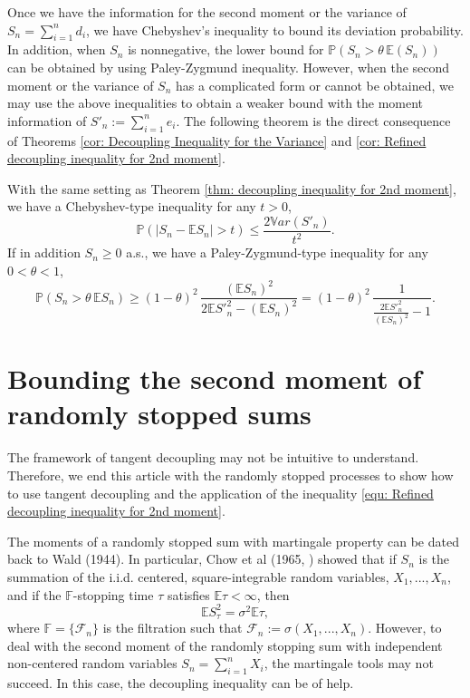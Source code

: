 \documentclass[ECP]{ejpecp} %
\newcommand{\F}{\mathcal{F}}
\newcommand{\lpar}{\left(}
\newcommand{\rpar}{\right)}
\newcommand{\pro}{\mathbb{P}}
\newcommand{\E}{\mathbb{E}}
\newcommand{\sumn}{\sum\limits_{i=1}^n}
\newcommand{\var}{\mathbb{V}ar}
\begin{document}
Once we have the information for the second moment or the variance of $ S_n = \sumn d_i$, we have Chebyshev's inequality to bound its deviation probability. In addition, when $S_n$ is nonnegative, the lower bound for $\pro(S_n>\theta \,\E(S_n))$ can be obtained by using Paley-Zygmund inequality. However, when the second moment or the variance of $S_n$ has a complicated form or cannot be obtained, we may use the above inequalities to obtain a weaker bound with the moment information of $S'_n:= \sumn e_i$. The following theorem is the direct consequence of Theorems \ref{cor: Decoupling Inequality for the Variance} and \ref{cor: Refined decoupling inequality for 2nd moment}.

\begin{theorem}
    \label{cor: Chebyshev inequ}
    With the same setting as Theorem \ref{thm: decoupling inequality for 2nd moment}, we have a Chebyshev-type inequality for any $t>0$,
    \begin{equation}
        \label{equ: Chebyshev ineq}
        \pro\lpar |S_n - \E S_n| >t \rpar \leq \frac{2\var(S'_n)}{t^2}.
    \end{equation}
    If in addition $S_n \geq 0$ a.s.,  we have a Paley-Zygmund-type inequality for any $0<\theta<1$,
    \begin{equation}
        \label{equ: Paley-Zygmund ineq}
        \pro(S_n > \theta\, \E S_n) \geq (1-\theta)^2 \, \frac{(\E S_n)^2}{ 2 \E {S'}_n^2 - (\E S_n)^2 } = (1-\theta)^2 \, \frac{1}{ \frac{2 \E {S'}_n^2}{(\E S_n)^2} - 1 }.
    \end{equation}
\end{theorem}



\section{Bounding the second moment of randomly stopped sums}
\label{sec: Applications}
The framework of tangent decoupling may not be intuitive to understand. Therefore, we end this article with the randomly stopped processes to show how to use tangent decoupling and the application of the inequality \eqref{equ: Refined decoupling inequality for 2nd moment}.


The moments of a randomly stopped sum with martingale property can be dated back to Wald \cite{wald1944cumulative} (1944). %
In particular, Chow et al (1965, \cite{chow1965moments}) showed that if $S_n$ is the summation of the i.i.d. centered, square-integrable random variables, $X_1,...,X_n$, and if the $\mathbb{F}$-stopping time $\tau$ satisfies $\E \tau <\infty$, then 
\[\E S^2_\tau = \sigma^2 \E \tau,\]
where $\mathbb{F} = \{\F_n\}$ is the filtration such that $\F_n := \sigma(X_1,...,X_n)$. However, to deal with the second moment of the randomly stopping sum with independent non-centered random variables $S_n = \sumn X_i$, the martingale tools may not succeed. In this case, the decoupling inequality can be of help. 
\end{document}
